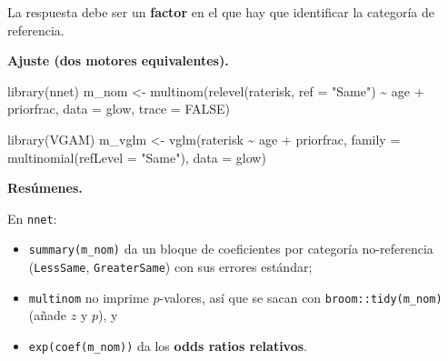 \documentclass[
  letterpaper,
  DIV=11,
  numbers=noendperiod]{scrartcl}
\newenvironment{Shaded}{\begin{snugshade}}{\end{snugshade}}
\newcommand{\AttributeTok}[1]{\textcolor[rgb]{0.40,0.45,0.13}{#1}}
\newcommand{\ConstantTok}[1]{\textcolor[rgb]{0.56,0.35,0.01}{#1}}
\newcommand{\FunctionTok}[1]{\textcolor[rgb]{0.28,0.35,0.67}{#1}}
\newcommand{\NormalTok}[1]{\textcolor[rgb]{0.00,0.23,0.31}{#1}}
\newcommand{\OtherTok}[1]{\textcolor[rgb]{0.00,0.23,0.31}{#1}}
\newcommand{\SpecialCharTok}[1]{\textcolor[rgb]{0.37,0.37,0.37}{#1}}
\newcommand{\StringTok}[1]{\textcolor[rgb]{0.13,0.47,0.30}{#1}}
\providecommand{\tightlist}{%
  \setlength{\itemsep}{0pt}\setlength{\parskip}{0pt}}\usepackage{longtable,booktabs,array}
\begin{document}
\begin{tcolorbox}[enhanced jigsaw, coltitle=black, rightrule=.15mm, arc=.35mm, leftrule=.75mm, colback=white, colbacktitle=quarto-callout-tip-color!10!white, left=2mm, breakable, toptitle=1mm, toprule=.15mm, bottomtitle=1mm, titlerule=0mm, title=\textcolor{quarto-callout-tip-color}{\faLightbulb}\hspace{0.5em}{🔧 En R. Ajustar e inspeccionar el multinomial nominal}, bottomrule=.15mm, opacityback=0, opacitybacktitle=0.6, colframe=quarto-callout-tip-color-frame]

La respuesta debe ser un \textbf{factor} en el que hay que identificar
la categoría de referencia.

\textbf{Ajuste (dos motores equivalentes).}

\begin{Shaded}
\begin{Highlighting}[]
\FunctionTok{library}\NormalTok{(nnet)}
\NormalTok{m\_nom  }\OtherTok{\textless{}{-}} \FunctionTok{multinom}\NormalTok{(}\FunctionTok{relevel}\NormalTok{(raterisk, }\AttributeTok{ref =} \StringTok{"Same"}\NormalTok{) }\SpecialCharTok{\textasciitilde{}}\NormalTok{ age }\SpecialCharTok{+}\NormalTok{ priorfrac, }\AttributeTok{data =}\NormalTok{ glow, }\AttributeTok{trace =} \ConstantTok{FALSE}\NormalTok{)}

\FunctionTok{library}\NormalTok{(VGAM)}
\NormalTok{m\_vglm }\OtherTok{\textless{}{-}} \FunctionTok{vglm}\NormalTok{(raterisk }\SpecialCharTok{\textasciitilde{}}\NormalTok{ age }\SpecialCharTok{+}\NormalTok{ priorfrac,}
               \AttributeTok{family =} \FunctionTok{multinomial}\NormalTok{(}\AttributeTok{refLevel =} \StringTok{"Same"}\NormalTok{), }\AttributeTok{data =}\NormalTok{ glow)}
\end{Highlighting}
\end{Shaded}

\textbf{Resúmenes.}

En \texttt{nnet}:

\begin{itemize}
\tightlist
\item
  \texttt{summary(m\_nom)} da un bloque de coeficientes por categoría
  no-referencia (\texttt{Less\textbar{}Same},
  \texttt{Greater\textbar{}Same}) con sus errores estándar;
\item
  \texttt{multinom} no imprime \(p\)-valores, así que se sacan con
  \texttt{broom::tidy(m\_nom)} (añade \(z\) y \(p\)), y
\item
  \texttt{exp(coef(m\_nom))} da los \textbf{odds ratios relativos}.
\end{itemize}


\end{tcolorbox}
\end{document}
